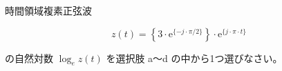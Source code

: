 \noindent 時間領域複素正弦波 

\[
z(t) = \left \{ 3 \cdot \textrm{e}^{\{ -j \cdot \pi/2 \}} \right \} \cdot \textrm{e}^{\{ j \cdot \pi \cdot t \}}
\]

\bigskip
\noindent の自然対数 $\log_e z(t)$ を選択肢 a〜d の中から1つ選びなさい。
